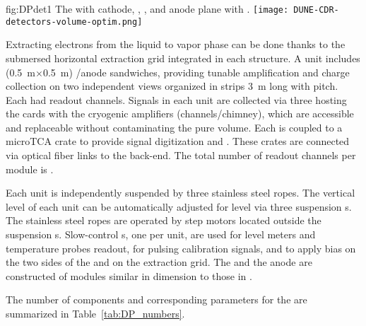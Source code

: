 \begin{dunefigure}{fig:DPdet1}
  {The  with cathode, , , and anode plane with .}
  \texttt{[image: DUNE-CDR-detectors-volume-optim.png]}
\end{dunefigure}

Extracting electrons from the liquid to vapor phase can be done thanks to the submersed horizontal extraction grid integrated in each  structure. A  unit includes \dpswchpercrp (0.5~m$\times$0.5~m) /anode sandwiches, providing tunable amplification and charge collection on two independent views organized in strips \SI{3}{m} long with \dpstrippitch pitch. Each  had \dpchpercrp readout channels. Signals in each  unit are collected via three  hosting the  cards with the cryogenic  amplifiers (\dpchperchimney channels/chimney), which are accessible and replaceable without contaminating the pure  volume. Each  is coupled to a microTCA crate to provide signal digitization and  . These crates are connected  via optical fiber links to the  back-end. The total number of readout channels  per \nominalmodsize module is \dpnumcrpch.

Each  unit is independently suspended by three stainless steel ropes. The vertical level of each  unit can be automatically adjusted for  level via three suspension \fdth{}s. The stainless steel ropes are operated by step motors located outside the suspension \fdth{}s. Slow-control \fdth{}s,  one per  unit, are used for level meters and temperature probes readout,   for pulsing calibration signals, and to apply  bias on the two sides of the  and on the extraction grid. The  and the anode are constructed of modules similar in dimension to those in .

The number of components and corresponding parameters for the \dpactivelarmass {} are summarized in Table~\ref{tab:DP_numbers}.

